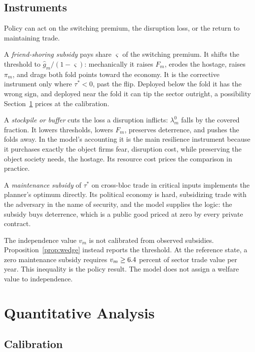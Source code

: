 \documentclass[11pt]{article}
\theoremstyle{definition}
\begin{document}
\subsection{Instruments}

Policy can act on the switching premium, the disruption loss, or the return to maintaining trade.

A \emph{friend-shoring subsidy} pays share $\varsigma$ of the switching premium. It shifts the threshold to $\hat g_m / (1 - \varsigma)$: mechanically it raises $F_m$, erodes the hostage, raises $\pi_m$, and drags both fold points toward the economy. It is the corrective instrument only where $\tau^* < 0$, past the flip. Deployed below the fold it has the wrong sign, and deployed near the fold it can tip the sector outright, a possibility Section~\ref{sec:quant} prices at the calibration.

A \emph{stockpile or buffer} cuts the loss a disruption inflicts: $\lambda^0_m$ falls by the covered fraction. It lowers thresholds, lowers $F_m$, preserves deterrence, and pushes the folds away. In the model's accounting it is the main resilience instrument because it purchases exactly the object firms fear, disruption cost, while preserving the object society needs, the hostage. Its resource cost prices the comparison in practice.

A \emph{maintenance subsidy} of $\tau^*$ on cross-bloc trade in critical inputs implements the planner's optimum directly. Its political economy is hard, subsidizing trade with the adversary in the name of security, and the model supplies the logic: the subsidy buys deterrence, which is a public good priced at zero by every private contract.

The independence value $v_m$ is not calibrated from observed subsidies. Proposition~\ref{prop:wedge} instead reports the threshold. At the reference state, a zero maintenance subsidy requires $v_m\geq6.4$ percent of sector trade value per year. This inequality is the policy result. The model does not assign a welfare value to independence.

\section{Quantitative Analysis}\label{sec:quant}

\subsection{Calibration}
\end{document}
